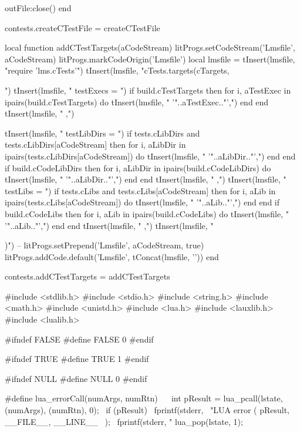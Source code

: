   outFile:close()
end

contests.createCTestFile = createCTestFile

local function addCTestTargets(aCodeStream)
  litProgs.setCodeStream('Lmsfile', aCodeStream)
  litProgs.markCodeOrigin('Lmsfile')
  local lmsfile = {}
  tInsert(lmsfile, "require 'lms.cTests'\n")
  tInsert(lmsfile, "cTests.targets(cTargets, {")
  tInsert(lmsfile, "  testExecs = {")
  if build.cTestTargets then
    for i, aTestExec in ipairs(build.cTestTargets) do
      tInsert(lmsfile, "    '"..aTestExec.."',")
    end
  end
  tInsert(lmsfile, "  },")

  tInsert(lmsfile, "  testLibDirs = {")
  if tests.cLibDirs and tests.cLibDirs[aCodeStream] then
    for i, aLibDir in ipairs(tests.cLibDirs[aCodeStream]) do
      tInsert(lmsfile, "    '"..aLibDir.."',")
    end
  end
  if build.cCodeLibDirs then 
    for i, aLibDir in ipairs(build.cCodeLibDirs) do
      tInsert(lmsfile, "    '"..aLibDir.."',")
    end
  end
  tInsert(lmsfile, "  },")
  tInsert(lmsfile, "  testLibs = {")
  if tests.cLibs and tests.cLibs[aCodeStream] then
    for i, aLib in ipairs(tests.cLibs[aCodeStream]) do
      tInsert(lmsfile, "    '"..aLib.."',")
    end
  end
  if build.cCodeLibs then 
    for i, aLib in ipairs(build.cCodeLibs) do
      tInsert(lmsfile, "    '"..aLib.."',")
    end
  end
  tInsert(lmsfile, "  },")
  tInsert(lmsfile, "})")
--  litProgs.setPrepend('Lmsfile', aCodeStream, true)
  litProgs.addCode.default('Lmsfile', tConcat(lmsfile, '\n'))
end

contests.addCTestTargets = addCTestTargets
\stopLuaCode

\startCHeader
#include <stdlib.h>
#include <stdio.h>
#include <string.h>
#include <math.h>
#include <unistd.h>
#include <lua.h>
#include <lauxlib.h>
#include <lualib.h>

#ifndef FALSE
#define FALSE 0
#endif

#ifndef TRUE
#define TRUE 1
#endif

#ifndef NULL
#define NULL 0
#endif

#define lua_errorCall(numArgs, numRtn)                     \
{                                                          \
  int pResult = lua_pcall(lstate, (numArgs), (numRtn), 0); \
  if (pResult) {                                           \
    fprintf(stderr,                                        \
      "LUA error (%
      pResult, __FILE__, __LINE__                          \
    );                                                     \
    fprintf(stderr, "%
    lua_pop(lstate, 1);                                    \
  }                                                        \
}

